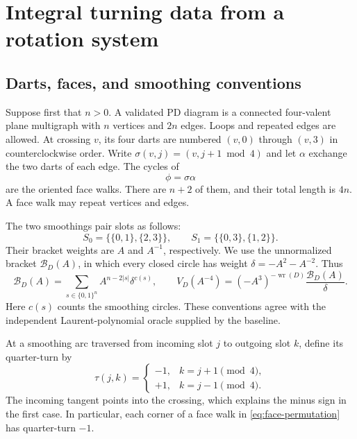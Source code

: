 \section{Integral turning data from a rotation system}
\label{sec:turning}

\subsection{Darts, faces, and smoothing conventions}

Suppose first that $n>0$. A validated PD diagram is a connected four-valent
plane multigraph with $n$ vertices and $2n$ edges. Loops and repeated edges
are allowed. At crossing $v$, its four darts are numbered $(v,0)$ through
$(v,3)$ in counterclockwise order. Write $\sigma(v,j)=(v,j+1\bmod4)$ and
let $\alpha$ exchange the two darts of each edge. The cycles of
\begin{equation}\label{eq:face-permutation}
 \phi=\sigma\alpha
\end{equation}
are the oriented face walks. There are $n+2$ of them, and their total length
is $4n$. A face walk may repeat vertices and edges.

The two smoothings pair slots as follows:
\[
 S_0=\{\{0,1\},\{2,3\}\},\qquad
 S_1=\{\{0,3\},\{1,2\}\}.
\]
Their bracket weights are $A$ and $A^{-1}$, respectively. We use the
unnormalized bracket $\mathcal B_D(A)$, in which every closed circle has
weight $\delta=-A^2-A^{-2}$. Thus
\begin{equation}\label{eq:bracket-state-sum}
 \mathcal B_D(A)=\sum_{s\in\{0,1\}^n}
      A^{n-2|s|}\delta^{c(s)},
 \qquad
 V_D(A^{-4})=(-A^3)^{-\operatorname{wr}(D)}
                   \frac{\mathcal B_D(A)}{\delta}.
\end{equation}
Here $c(s)$ counts the smoothing circles. These conventions agree with the
independent Laurent-polynomial oracle supplied by the baseline.

At a smoothing arc traversed from incoming slot $j$ to outgoing slot $k$,
define its quarter-turn by
\begin{equation}\label{eq:corner-turn}
 \tau(j,k)=
 \begin{cases}
 -1,&k=j+1\pmod4,\\
 +1,&k=j-1\pmod4.
 \end{cases}
\end{equation}
The incoming tangent points into the crossing, which explains the minus
sign in the first case. In particular, each corner of a face walk in
\eqref{eq:face-permutation} has quarter-turn $-1$.

